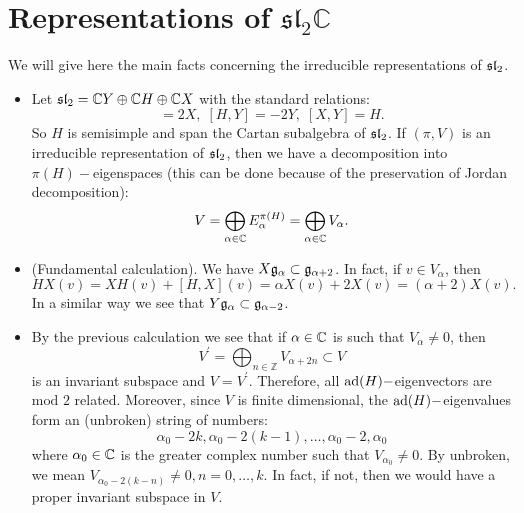 \section{\texorpdfstring{Representations of $\mathfrak{sl}_2\mathbb{C}$}{Representations of }}
We will give here the main facts concerning the irreducible representations of $\mathfrak{sl}_2$.

\begin{itemize}
    \item Let $\mathfrak{sl}_2=\mathbb{C} Y\oplus \mathbb{C} H\oplus \mathbb{C} X$ with the standard relations:
    \begin{equation}
    [H,X]=2X,\;[H,Y]=-2Y,\;[X,Y]=H.    
    \end{equation}
    So $H$ is semisimple and span the Cartan subalgebra of $\mathfrak{sl}_2$. If $(\pi,V)$ is an irreducible representation of 
    $\mathfrak{sl}_2$, then we have a decomposition into $\pi(H)-$eigenspaces (this can be done because of the preservation of 
    Jordan decomposition):
    \begin{equation}
        V = \bigoplus_{\alpha\in\mathbb{C}}E_\alpha^{\pi(H)}=\bigoplus_{\alpha\in\mathbb{C}}V_\alpha.
    \end{equation}
    \item (Fundamental calculation). We have $X\mathfrak{g}_\alpha\subset \mathfrak{g}_{\alpha+2}$. In fact, if $v\in V_\alpha$, then
    \begin{equation}
        HX(v)=XH(v)+[H,X](v)=\alpha X(v)+2X(v)=(\alpha+2)X(v). 
    \end{equation}
    In a similar way we see that $Y\mathfrak{g}_\alpha\subset \mathfrak{g}_{\alpha-2}$.
    \item By the previous calculation we see that if $\alpha\in\mathbb{C}$ is such that $V_\alpha\neq0$, then 
    \begin{equation}
        V^\prime =\bigoplus_{n\in\mathbb{Z}}V_{\alpha+2n}\subset V
    \end{equation}
    is an invariant subspace and $V=V^\prime$. Therefore, all $\text{ad}(H)-$eigenvectors are $\text{mod }2$ related.
    Moreover, since $V$ is finite dimensional, the $\text{ad}(H)-$eigenvalues form an (unbroken) string of numbers:
    \begin{equation}
       \alpha_0-2k, \alpha_0-2(k-1),\dots, \alpha_0 -2,\alpha_0 
    \end{equation}
    where $\alpha_0\in\mathbb{C}$ is the greater complex number such that $V_{\alpha_0}\neq0$.
    By unbroken, we mean $V_{\alpha_0-2(k-n)}\neq0, n=0,\dots,k$. In fact, if 
    not, then we would have a proper invariant subspace in $V$.

\end{itemize}
